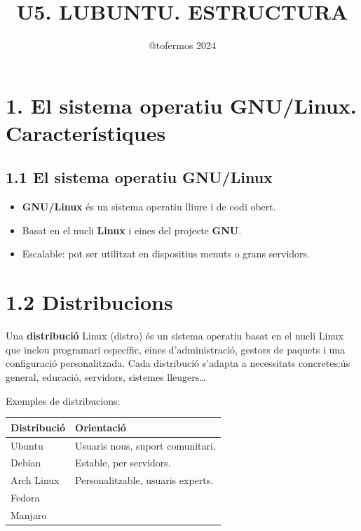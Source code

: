 \documentclass[
  a4paper,
]{article}
\title{U5. LUBUNTU. ESTRUCTURA}
\author{@tofermos 2024}
\date{}
\providecommand{\tightlist}{%
  \setlength{\itemsep}{0pt}\setlength{\parskip}{0pt}}
\begin{document}
\maketitle

{
\setcounter{tocdepth}{2}
\tableofcontents
}
\newpage
\renewcommand\tablename{Tabla}

\section{1. El sistema operatiu GNU/Linux.
Característiques}\label{el-sistema-operatiu-gnulinux.-caracteruxedstiques}

\subsection{1.1 El sistema operatiu
GNU/Linux}\label{el-sistema-operatiu-gnulinux}

\begin{itemize}
\tightlist
\item
  \textbf{GNU/Linux} és un sistema operatiu lliure i de codi obert.
\item
  Basat en el nucli \textbf{Linux} i eines del projecte \textbf{GNU}.
\item
  Escalable: pot ser utilitzat en dispositius menuts o grans servidors.
\end{itemize}

\section{1.2 Distribucions}\label{distribucions}

Una \textbf{distribució} Linux (distro) és un sistema operatiu basat en
el nucli Linux que inclou programari específic, eines d'administració,
gestors de paquets i una configuració personalitzada. Cada distribució
s'adapta a necessitats concretes:ús general, educació, servidors,
sistemes lleugers\ldots{}

Exemples de distribucions:

\begin{longtable}[]{@{}ll@{}}
\toprule\noalign{}
\textbf{Distribució} & \textbf{Orientació} \\
\midrule\noalign{}
\endhead
\bottomrule\noalign{}
\endlastfoot
Ubuntu & Usuaris nous, suport comunitari. \\
Debian & Estable, per servidors. \\
Arch Linux & Personalitzable, usuaris experts. \\
Fedora & \\
Manjaro & \\
\end{longtable}
\end{document}
